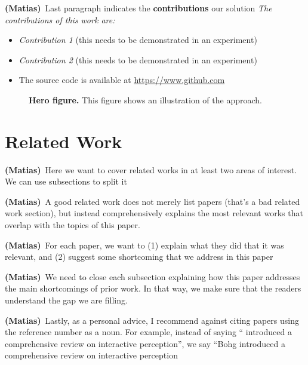 \documentclass[letterpaper, 10 pt, conference]{ieeeconf}
\newcommand{\matias}[1]{\textcolor{RubineRed}{\textbf{(Matias)}~#1}}
\begin{document}
\matias{Last paragraph indicates the \textbf{contributions} our solution} 
\textit{The contributions of this work are:}
\begin{itemize}[leftmargin=10pt]
\item \textit{Contribution 1} (this needs to be demonstrated in an experiment)
\item \textit{Contribution 2 }(this needs to be demonstrated in an experiment)
\item The source code is available at \url{https://www.github.com}
\end{itemize}


\begin{figure}[t]
  \centering
  \caption{\textbf{Hero figure.} This figure shows an illustration of the approach.}
  \label{fig:hero-figure}
\end{figure}


\section{Related Work}
\matias{Here we want to cover related works in at least two areas of interest. We can use subsections to split it}

\matias{A good related work does not merely list papers (that's a bad related work section), but instead comprehensively explains the most relevant works that overlap with the topics of this paper. }

\matias{For each paper, we want to (1) explain what they did that it was relevant, and (2) suggest some shortcoming that we address in this paper}

\matias{We need to close each subsection explaining how this paper addresses the main shortcomings of prior work. In that way, we make sure that the readers understand the gap we are filling.}

\matias{Lastly, as a personal advice, I recommend against citing papers using the reference number as a noun. For example, instead of saying ``\cite{bohg2017interactive} introduced a comprehensive review on interactive perception'', we say ``Bohg \etal{} \cite{bohg2017interactive} introduced a comprehensive review on interactive perception }
\end{document}
